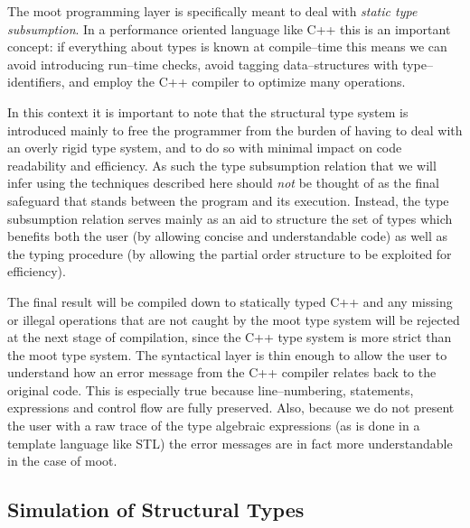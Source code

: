 \documentclass{sigplanconf}
\begin{document}
The {\sc moot} programming layer is specifically meant to deal with
\emph{static type subsumption}. In a performance oriented language
like C++ this is an important concept: if everything about types is
known at compile--time this means we can avoid introducing run--time
checks, avoid tagging data--structures with type--identifiers, and
employ the C++ compiler to optimize many operations.

In this context it is important to note that the structural type
system is introduced mainly to free the programmer from the burden of
having to deal with an overly rigid type system, and to do so with
minimal impact on code readability and efficiency.
As such the type subsumption relation that we will infer using the
techniques described here should \emph{not} be thought of as the final
safeguard that stands between the program and its execution.
Instead, the type subsumption relation serves mainly as an aid to
structure the set of types which benefits both the user (by allowing
concise and understandable code) as well as the typing procedure (by
allowing the partial order structure to be exploited for efficiency).

The final result will be compiled down to statically typed C++ and any
missing or illegal operations that are not caught by the {\sc moot}
type system will be rejected at the next stage of compilation, since
the C++ type system is more strict than the {\sc moot} type system.
The syntactical layer is thin enough to allow the user to understand
how an error message from the C++ compiler relates back to the
original code. This is especially true because line--numbering,
statements, expressions and control flow are fully preserved.
Also, because we do not present the user with a raw trace of the type
algebraic expressions (as is done in a template language like STL) the
error messages are in fact more understandable in the case of {\sc
  moot}.

\subsection{Simulation of Structural Types}
\end{document}
